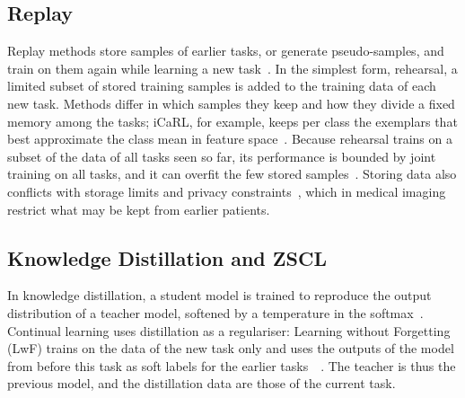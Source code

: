 \subsection{Replay}
\label{subsec:bg-replay}

Replay methods store samples of earlier tasks, or generate pseudo-samples, and train on them again while learning a new task~\cite[Sec.~3.1]{delange2022}.
In the simplest form, rehearsal, a limited subset of stored training samples is added to the training data of each new task.
Methods differ in which samples they keep and how they divide a fixed memory among the tasks; iCaRL, for example, keeps per class the exemplars that best approximate the class mean in feature space~\cite[Sec.~3.1]{delange2022}.
Because rehearsal trains on a subset of the data of all tasks seen so far, its performance is bounded by joint training on all tasks, and it can overfit the few stored samples~\cite[Sec.~3.1]{delange2022}.
Storing data also conflicts with storage limits and privacy constraints~\cite[Sec.~1]{delange2022}, which in medical imaging restrict what may be kept from earlier patients.

\subsection{Knowledge Distillation and ZSCL}
\label{subsec:bg-zscl}

In knowledge distillation, a student model is trained to reproduce the output distribution of a teacher model, softened by a temperature in the softmax~\cite[Sec.~2]{hinton2015distilling}.
Continual learning uses distillation as a regulariser: Learning without Forgetting (LwF) trains on the data of the new task only and uses the outputs of the model from before this task as soft labels for the earlier tasks~\cite{li2017learningforgetting}~\cite[Sec.~3.2.1]{delange2022}.
The teacher is thus the previous model, and the distillation data are those of the current task.

